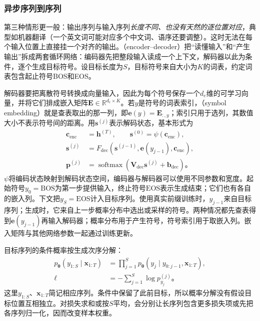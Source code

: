 \subsubsection{异步序列到序列}
\label{sec:rnn-encoder-decoder}

第三种情形更一般：输出序列与输入序列\emph{长度不同、也没有天然的逐位置对应}，典型如机器翻译（一个英文词可能对应多个中文词、语序还要调整）。这时无法在每个输入位置上直接挂一个对齐的输出。（encoder--decoder）把“读懂输入”和“产生输出”拆成两套循环网络：编码器先把整段输入读成一个上下文，解码器以此为条件，逐个生成目标符号。设目标长度为$S$，目标符号来自大小为$K$的词表，约定词表包含起止符号BOS和EOS。

解码器要把离散符号转换成向量输入，因此为每个符号保存一个$d_e$维的可学习向量，并将它们排成嵌入矩阵$\bm{E}\in\mathbb{R}^{d_e\times K}$。若$y$是符号的词表索引，（symbol embedding）就是查表取出的那一列，即$\bm{e}(y)=\bm{E}_{:,y}$；索引只用于选列，其数值大小不表示符号间的距离。用$\bm{s}^{(j)}$表示解码状态，基本形式为
\begin{equation}
  \begin{aligned}
    \bm{c}_{\mathrm{enc}}&=\bm{h}^{(T)},\qquad
    \bm{s}^{(0)}=\psi(\bm{c}_{\mathrm{enc}}),\\
    \bm{s}^{(j)}&=F_{\mathrm{dec}}\!\left(
      \bm{s}^{(j-1)},\bm{e}(y_{j-1}),\bm{c}_{\mathrm{enc}}\right),\\
    \bm{p}^{(j)}&=\operatorname{softmax}\!\left(
      \bm{V}_{\mathrm{dec}}\bm{s}^{(j)}+\bm{b}_{\mathrm{dec}}\right)\text{。}
  \end{aligned}
  \label{eq:rnn-encoder-decoder}
\end{equation}
$\psi$将编码状态映射到解码状态空间，编码器与解码器可以使用不同参数和宽度。起始符号$y_0=\mathrm{BOS}$为第一步提供输入，终止符号$\mathrm{EOS}$表示生成结束；它们也有各自的嵌入列。下文把$y_S=\mathrm{EOS}$计入目标序列。使用真实前缀训练时，$y_{j-1}$来自目标序列；生成时，它来自上一步概率分布中选出或采样的符号。两种情况都先查表得到$\bm{e}(y_{j-1})$再输入解码器；概率分布用于产生符号，符号索引用于取嵌入列。嵌入矩阵与其他网络参数一起通过训练更新。

目标序列的条件概率按生成次序分解：
\begin{equation}
  \begin{aligned}
    p_{\bm{\theta}}(y_{1:S}\mid\bm{x}_{1:T})
      &=\prod_{j=1}^{S}p_{\bm{\theta}}
        (y_j\mid y_{0:j-1},\bm{x}_{1:T}),\\
    \ell&=-\sum_{j=1}^{S}\log p^{(j)}_{y_j}\text{。}
  \end{aligned}
  \label{eq:rnn-sequence-likelihood}
\end{equation}
这里$y_{1:S}$、$\bm{x}_{1:T}$简记相应序列。条件中保留了此前目标，所以概率分解没有假设目标位置互相独立。对损失求和或按$S$平均，会分别让长序列包含更多损失项或先把各序列归一化，因而改变样本权重。

